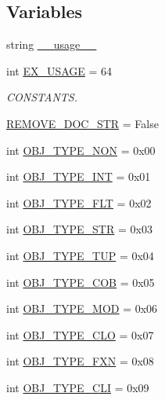 \subsection*{Variables}
\begin{DoxyCompactItemize}
\item 
string \hyperlink{namespacepm_img_creator_a0826fed3c48c5795ff53b0ec0ec077ba}{\-\_\-\-\_\-usage\-\_\-\-\_\-}
\item 
int \hyperlink{namespacepm_img_creator_a421674165be1a6c49d7bd770e0b3f592}{E\-X\-\_\-\-U\-S\-A\-G\-E} = 64
\begin{DoxyCompactList}\small\item\em C\-O\-N\-S\-T\-A\-N\-T\-S. \end{DoxyCompactList}\item 
\hyperlink{namespacepm_img_creator_aa9a156305d90c5f6e1cab261db363edc}{R\-E\-M\-O\-V\-E\-\_\-\-D\-O\-C\-\_\-\-S\-T\-R} = False
\item 
int \hyperlink{namespacepm_img_creator_ad6ecd60a9bf604250f5bb112f49774ee}{O\-B\-J\-\_\-\-T\-Y\-P\-E\-\_\-\-N\-O\-N} = 0x00
\item 
int \hyperlink{namespacepm_img_creator_a5850308dea98e59546222e2a3e84c390}{O\-B\-J\-\_\-\-T\-Y\-P\-E\-\_\-\-I\-N\-T} = 0x01
\item 
int \hyperlink{namespacepm_img_creator_a18f7137f0383016c3dedc0c540f90836}{O\-B\-J\-\_\-\-T\-Y\-P\-E\-\_\-\-F\-L\-T} = 0x02
\item 
int \hyperlink{namespacepm_img_creator_a1cbddb270279fce34c8984eaa59bb994}{O\-B\-J\-\_\-\-T\-Y\-P\-E\-\_\-\-S\-T\-R} = 0x03
\item 
int \hyperlink{namespacepm_img_creator_a2d27005c7b2d92bcbe8d6ae55b2cbd42}{O\-B\-J\-\_\-\-T\-Y\-P\-E\-\_\-\-T\-U\-P} = 0x04
\item 
int \hyperlink{namespacepm_img_creator_ad802353f2974f450f387baf7341370dd}{O\-B\-J\-\_\-\-T\-Y\-P\-E\-\_\-\-C\-O\-B} = 0x05
\item 
int \hyperlink{namespacepm_img_creator_a31466f4a20e0785147058b990814289a}{O\-B\-J\-\_\-\-T\-Y\-P\-E\-\_\-\-M\-O\-D} = 0x06
\item 
int \hyperlink{namespacepm_img_creator_af1f3b6f0bb8db8e16b64ed3c04ad6215}{O\-B\-J\-\_\-\-T\-Y\-P\-E\-\_\-\-C\-L\-O} = 0x07
\item 
int \hyperlink{namespacepm_img_creator_af77f8422ea2a40d75f181118d0ad0dc7}{O\-B\-J\-\_\-\-T\-Y\-P\-E\-\_\-\-F\-X\-N} = 0x08
\item 
int \hyperlink{namespacepm_img_creator_ae64d6814dd206b385ad128e27db02ed7}{O\-B\-J\-\_\-\-T\-Y\-P\-E\-\_\-\-C\-L\-I} = 0x09

\end{DoxyCompactItemize}
